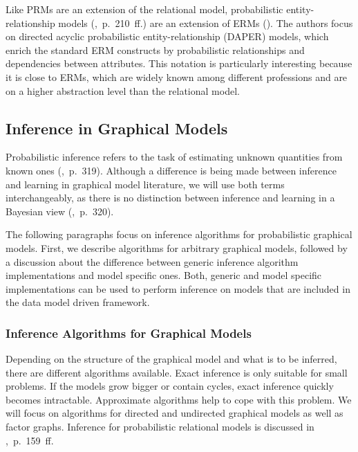 Like PRMs are an extension of the relational model, probabilistic entity-relationship models (\cite{heckerman2007probabilistic},~p.~210~ff.) are an extension of ERMs (\cite{chen1976entity}). The authors focus on directed acyclic probabilistic entity-relationship (DAPER) models, which enrich the standard ERM constructs by probabilistic relationships and dependencies between attributes. This notation is particularly interesting because it is close to ERMs, which are widely known among different professions and are on a higher abstraction level than the relational model.

\subsection{Inference in Graphical Models}
\label{subsec:inference}

Probabilistic inference refers to the task of estimating unknown quantities from known ones (\cite{murphy2012machine},~p.~319). Although a difference is being made between inference and learning in graphical model literature, we will use both terms interchangeably, as there is no distinction between inference and learning in a Bayesian view (\cite{murphy2012machine},~p.~320).

The following paragraphs focus on inference algorithms for probabilistic graphical models. First, we describe algorithms for arbitrary graphical models, followed by a discussion about the difference between generic inference algorithm implementations and model specific ones. Both, generic and model specific implementations can be used to perform inference on models that are included in the data model driven framework.

\subsubsection{Inference Algorithms for Graphical Models}

Depending on the structure of the graphical model and what is to be inferred, there are different algorithms available. Exact inference is only suitable for small problems. If the models grow bigger or contain cycles, exact inference quickly becomes intractable. Approximate algorithms help to cope with this problem. We will focus on algorithms for directed and undirected graphical models as well as factor graphs. Inference for probabilistic relational models is discussed in \textcite{getoor2007introduction},~p.~159~ff.

